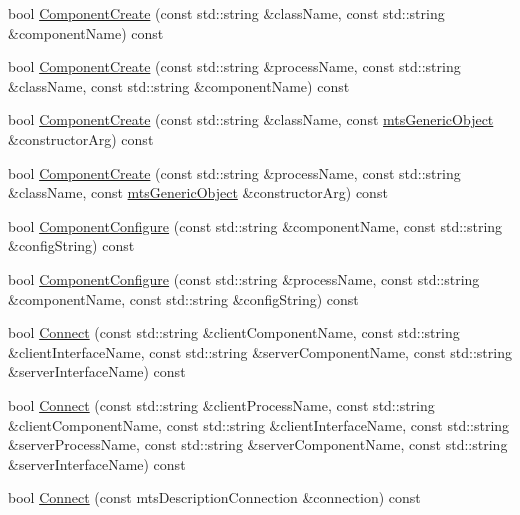 {\bf }\par
\begin{DoxyCompactItemize}
\item 
bool \hyperlink{classmts_manager_component_services_a31785266eab548a48d80fa2ed08bc014}{Component\+Create} (const std\+::string \&class\+Name, const std\+::string \&component\+Name) const 
\item 
bool \hyperlink{classmts_manager_component_services_ac599f7d70cb120ece10738d85d20769f}{Component\+Create} (const std\+::string \&process\+Name, const std\+::string \&class\+Name, const std\+::string \&component\+Name) const 
\item 
bool \hyperlink{classmts_manager_component_services_a42295c2a3b32c5c0a1cc60b06f9ecc83}{Component\+Create} (const std\+::string \&class\+Name, const \hyperlink{classmts_generic_object}{mts\+Generic\+Object} \&constructor\+Arg) const 
\item 
bool \hyperlink{classmts_manager_component_services_a0dab190b31f59d5cfd2084ecbc4a2f66}{Component\+Create} (const std\+::string \&process\+Name, const std\+::string \&class\+Name, const \hyperlink{classmts_generic_object}{mts\+Generic\+Object} \&constructor\+Arg) const 
\item 
bool \hyperlink{classmts_manager_component_services_a2bf55bf6eaaa1c9d06e014fa1ea5c5f3}{Component\+Configure} (const std\+::string \&component\+Name, const std\+::string \&config\+String) const 
\item 
bool \hyperlink{classmts_manager_component_services_a6f13d3fc2eebbc1a21199c7554aae16e}{Component\+Configure} (const std\+::string \&process\+Name, const std\+::string \&component\+Name, const std\+::string \&config\+String) const 
\item 
bool \hyperlink{classmts_manager_component_services_a862a86135ddef6f3c7fc771ecbf395d8}{Connect} (const std\+::string \&client\+Component\+Name, const std\+::string \&client\+Interface\+Name, const std\+::string \&server\+Component\+Name, const std\+::string \&server\+Interface\+Name) const 
\item 
bool \hyperlink{classmts_manager_component_services_a31924511ca987ea4c7f632f91e922b83}{Connect} (const std\+::string \&client\+Process\+Name, const std\+::string \&client\+Component\+Name, const std\+::string \&client\+Interface\+Name, const std\+::string \&server\+Process\+Name, const std\+::string \&server\+Component\+Name, const std\+::string \&server\+Interface\+Name) const 
\item 
bool \hyperlink{classmts_manager_component_services_a0dd0677b3e5877c80caf8f7f53ad69f4}{Connect} (const mts\+Description\+Connection \&connection) const 

\end{DoxyCompactItemize}
